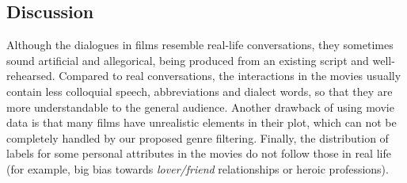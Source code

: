 \subsection{Discussion}

Although the dialogues in films resemble real-life conversations, they sometimes sound artificial and allegorical, being produced from an existing script and well-rehearsed. Compared to real conversations, the interactions in the movies usually contain less colloquial speech, abbreviations and dialect words, so that they are more understandable to the general audience. Another drawback of using movie data is that many films have unrealistic elements in their plot, which can not be completely handled by our proposed genre filtering. Finally, the distribution of labels for some personal attributes in the movies do not follow those in real life (for example, big bias towards \textit{lover/friend} relationships or heroic professions).




